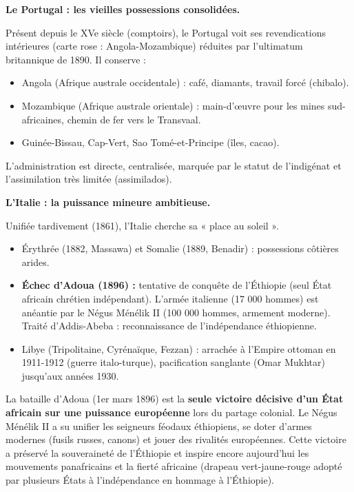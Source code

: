 \documentclass[11pt]{article}
\newcommand{\cle}[1]{{\popxbold\color{popdark}#1}}
\begin{document}
\textbf{Le Portugal : les vieilles possessions consolidées.}\par
Présent depuis le XVe siècle (comptoirs), le Portugal voit ses revendications intérieures (carte rose : Angola-Mozambique) réduites par l'ultimatum britannique de 1890. Il conserve :
\begin{itemize}
    \item \cle{Angola} (Afrique australe occidentale) : café, diamants, travail forcé (\cle{chibalo}).
    \item \cle{Mozambique} (Afrique australe orientale) : main-d'œuvre pour les mines sud-africaines, chemin de fer vers le Transvaal.
    \item \cle{Guinée-Bissau}, \cle{Cap-Vert}, \cle{Sao Tomé-et-Principe} (îles, cacao).
\end{itemize}
L'administration est directe, centralisée, marquée par le \cle{statut de l'indigénat} et l'assimilation très limitée (\cle{assimilados}).

\textbf{L'Italie : la puissance mineure ambitieuse.}\par
Unifiée tardivement (1861), l'Italie cherche sa « place au soleil ».
\begin{itemize}
    \item \cle{Érythrée} (1882, Massawa) et \cle{Somalie} (1889, Benadir) : possessions côtières arides.
    \item \textbf{Échec d'Adoua (1896) :} tentative de conquête de l'\cle{Éthiopie} (seul État africain chrétien indépendant). L'armée italienne (17 000 hommes) est anéantie par le \cle{Négus Ménélik II} (100 000 hommes, armement moderne). Traité d'Addis-Abeba : reconnaissance de l'indépendance éthiopienne.
    \item \cle{Libye} (Tripolitaine, Cyrénaïque, Fezzan) : arrachée à l'Empire ottoman en 1911-1912 (guerre italo-turque), pacification sanglante (Omar Mukhtar) jusqu'aux années 1930.
\end{itemize}

\begin{savaistu}
La bataille d'\cle{Adoua} (1er mars 1896) est la \textbf{seule victoire décisive d'un État africain sur une puissance européenne} lors du partage colonial. Le Négus Ménélik II a su unifier les seigneurs féodaux éthiopiens, se doter d'armes modernes (fusils russes, canons) et jouer des rivalités européennes. Cette victoire a préservé la souveraineté de l'Éthiopie et inspire encore aujourd'hui les mouvements panafricains et la fierté africaine (drapeau vert-jaune-rouge adopté par plusieurs États à l'indépendance en hommage à l'Éthiopie).
\end{savaistu}
\end{document}

